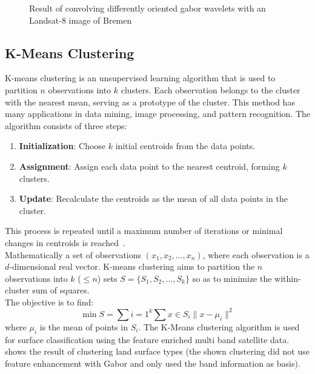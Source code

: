\documentclass[12pt,a4paper, english]{article}
\begin{document}
\begin{figure}[!htbp]
\begin{subfigure}[b]{0.45\textwidth}
         \label{fig:feat06}
     \end{subfigure}
        \caption{Result of convolving differently oriented gabor wavelets with an Landsat-8 image of Bremen}\label{fig:gaborExample}
    \end{figure}

%
\newpage
  \subsection{K-Means Clustering}\label{sec:kmeans}
    K-means clustering is an unsupervised learning algorithm that is used to partition $n$ observations into $k$ clusters. 
    Each observation belongs to the cluster with the nearest mean, serving as a prototype of the cluster. 
    This method has many applications in data mining, image processing, and pattern recognition.
    The algorithm consists of three steps:
    \begin{enumerate}
        \item \textbf{Initialization}: Choose $k$ initial centroids from the data points.
        \item \textbf{Assignment}: Assign each data point to the nearest centroid, forming $k$ clusters.
        \item \textbf{Update}: Recalculate the centroids as the mean of all data points in the cluster. 
    \end{enumerate}
    This process is repeated until a maximum number of iterations or minimal changes in centroids is reached~\autocite{Sinaga2020}.\\ %
    Mathematically a set of observations $(x_1, x_2, \ldots, x_n)$, where each observation is a $d$-dimensional real vector.
    K-means clustering aims to partition the $n$ observations into $k$ ($\leq n$) sets $S = \{S_1, S_2, \ldots, S_k\}$ so as to minimize the within-cluster sum of squares. \\
    The objective is to find:
    \begin{equation}
        \min{S} = \sum{i=1}^{k} \sum{x \in S_i} \| x - \mu_i \|^2
    \end{equation}
    where $\mu_i$ is the mean of points in $S_i$.
    The K-Means clustering algorithm is used for surface classification using the feature enriched multi band satellite data.
     shows the result of clustering land surface types (the shown clustering did not use feature enhancement with Gabor and only used the band information as basis).%
\end{document}
